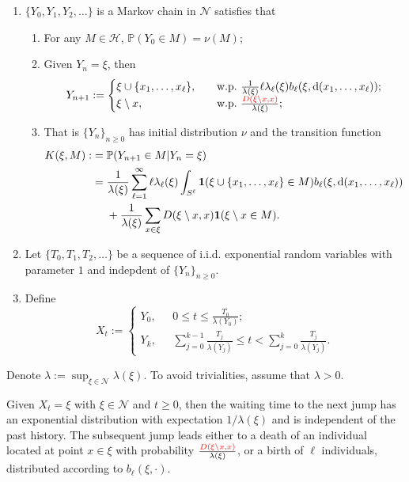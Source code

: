 \documentclass[12pt]{article}
\def\IP{\prob}
\newcommand{\Pro}{\mathbb{P}}
\newcommand{\prob}{\Pro}
\newcommand{\bone}{{\bf 1}}
\newcommand{\red}[1]{\textcolor{red}{#1}}
\numberwithin{equation}{section}
\begin{document}
\begin{enumerate}
	\item $\{Y_0,Y_1,Y_2,\dots\}$ is a Markov chain in $\mathcal{N}$ satisfies that
\begin{enumerate}
	\item For any $M\in\mathscr{H}$, $\IP(Y_0\in M)=\nu(M)$;
	\item Given $Y_n=\xi$, then 
\begin{equation}
	Y_{n+1}:=\begin{cases}
		\xi\cup\{x_1,\dots,x_\ell\},\ \ \ &\mbox{w.p.}~\frac{1}{\lambda(\xi)}\ell\lambda_{\ell}(\xi)b_{\ell}(\xi,\mathrm{d}(x_1,\dots,x_{\ell}));\\
		\xi\setminus x,\ \ \ &\mbox{w.p.}~\frac{\red{D(\xi\setminus x,x)}}{\lambda(\xi)};
	\end{cases}
\end{equation}
\item That is $\{Y_n\}_{n\ge0}$ has initial distribution $\nu$ and the transition function
\begin{align}
	K(\xi,M):&=\IP(Y_{n+1}\in M|Y_n=\xi)\nonumber\\
		  &=\frac{1}{\lambda(\xi)}\sum_{\ell=1}^{\infty}\ell\lambda_{\ell}(\xi)\int_{S^{\ell}}\bone(\xi\cup\{x_1,\dots,x_\ell\}\in M)b_{\ell}(\xi,\mathrm{d}(x_1,\dots,x_{\ell}))\nonumber\\
		  &\ \ \ \ +\frac{1}{\lambda(\xi)}\sum_{x\in\xi}D(\xi\setminus x,x)\bone(\xi\setminus x\in M).\label{trans1}
\end{align}
\end{enumerate}
\item Let $\{T_0,T_1,T_2,\dots\}$ be a sequence of i.i.d. exponential random variables with parameter $1$ and indepdent of $\{Y_n\}_{n\ge0}$.
\item Define 
\begin{equation}
	X_t:=\begin{cases}Y_0,\ \ \ &0\le t \le \frac{T_0}{\lambda(Y_0)};\\
		Y_k,\ \ \ &\sum_{j=0}^{k-1}\frac{T_j}{\lambda(Y_j)}\le t<\sum_{j=0}^k\frac{T_j}{\lambda(Y_j)}.
	\end{cases}
\end{equation}
\end{enumerate}
Denote $\lambda:=\sup_{\xi\in\mathcal{N}}\lambda(\xi)$. To avoid trivialities, assume that $\lambda>0$. 


Given $X_t=\xi$ with $\xi\in\mathcal{N}$ and $t\ge0$, then the waiting time to the next jump has an exponential distribution with expectation $1/\lambda(\xi)$ and is independent of the past history. The subsequent jump leads either to a death of an individual located at point $x\in\xi$ with probability $\frac{\red{D(\xi\setminus x,x)}}{\lambda(\xi)}$, or a birth of $\ell$ individuals, distributed according to $b_{\ell}(\xi,\cdot)$.  
\end{document}
